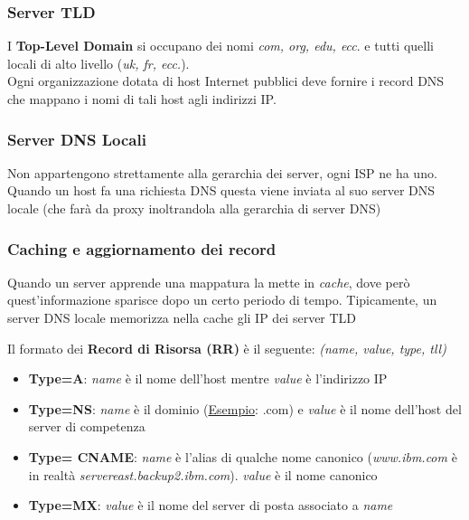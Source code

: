 \documentclass{article}
\newcounter{subsubsubsection}[subsubsection]
\begin{document}
            \subsubsection{Server TLD}
                I \textbf{Top-Level Domain} si occupano dei nomi \textit{com, org, edu, ecc}. e tutti quelli locali di alto livello (\textit{uk, fr, ecc.}).\\
                Ogni organizzazione dotata di host Internet pubblici deve fornire i record DNS che mappano i nomi di tali host agli indirizzi IP. 

            \subsubsection{Server DNS Locali}
                Non appartengono strettamente alla gerarchia dei server, ogni ISP ne ha uno. Quando un host fa una richiesta DNS questa viene inviata al suo server DNS locale (che farà da proxy inoltrandola alla gerarchia di server DNS)

            \subsubsection{Caching e aggiornamento dei record}
                Quando un server apprende una mappatura la mette in \textit{cache}, dove però quest'informazione sparisce dopo un certo periodo di tempo. Tipicamente, un server DNS locale memorizza nella cache gli IP dei server TLD

                    Il formato dei \textbf{Record di Risorsa (RR)} è il seguente: \textit{(name, value, type, tll)}
                    \begin{itemize}
                        \item \textbf{Type=A}: \textit{name} è il nome dell'host mentre \textit{value} è l'indirizzo IP
                        \item \textbf{Type=NS}: \textit{name} è il dominio (\underline{Esempio}: .com) e \textit{value} è il nome dell'host del server di competenza
                        \item \textbf{Type= CNAME}: \textit{name} è l'alias di qualche nome canonico (\textit{www.ibm.com} è in realtà \textit{servereast.backup2.ibm.com}). \textit{value} è il nome canonico
                        \item \textbf{Type=MX}: \textit{value} è il nome del server di posta associato a \textit{name}
                    \end{itemize}
\end{document}
